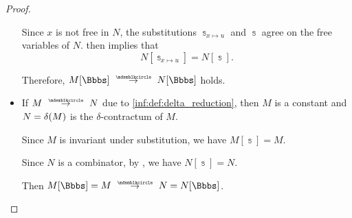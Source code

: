 \begin{proof}
\begin{itemize}
    Since \( x \) is not free in \( N \), the substitutions \( \Bbbs_{x \mapsto u} \) and \( \Bbbs \) agree on the free variables of \( N \).  then implies that
    \begin{equation*}
      N[\Bbbs_{x \mapsto u}] = N[\Bbbs].
    \end{equation*}

    Therefore, \( M[\Bbbs] \pred N[\Bbbs] \) holds.

    \item If \( M \pred N \) due to \ref{inf:def:delta_reduction}, then \( M \) is a constant and \( N = \op*{\delta}(M) \) is the \( \delta \)-contractum of \( M \).

    Since \( M \) is invariant under substitution, we have \( M[\Bbbs] = M \).

    Since \( N \) is a combinator, by , we have \( N[\Bbbs] = N \).

    Then \( M[\Bbbs] = M \pred N = N[\Bbbs] \).
  \end{itemize}
\end{proof}
